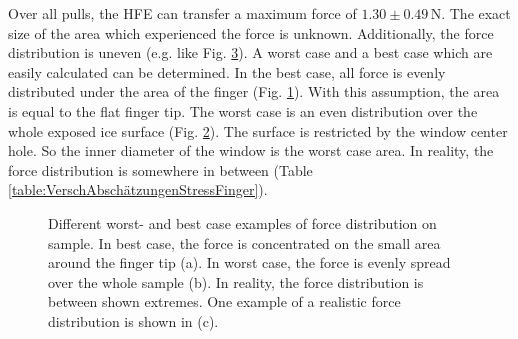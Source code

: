 Over all pulls, the HFE can transfer a maximum force of $1.30\pm0.49\,\si{\newton}$. The exact size of the area which experienced the force is unknown. Additionally, the force distribution is uneven (e.g. like Fig. \ref{fig:ZeichnungBerechnungStress_c}). A worst case and a best case which are easily calculated can be determined. In the best case, all force is evenly distributed under the area of the finger (Fig. \ref{fig:ZeichnungBerechnungStress_a}). With this assumption, the area is equal to the flat finger tip. The worst case is an even distribution over the whole exposed ice surface (Fig. \ref{fig:ZeichnungBerechnungStress_b}). The surface is restricted by the window center hole. So the inner diameter of the window is the worst case area. In reality, the force distribution is somewhere in between (Table \ref{table:VerschAbschätzungenStressFinger}).

\begin{figure}[hbt!]
	\centering
	\begin{subfigure}[]{0.3\textwidth}
		\centering
		
		\caption{}
		\label{fig:ZeichnungBerechnungStress_a}
	\end{subfigure}
	\begin{subfigure}[]{0.3\textwidth}
		\centering
		
		\caption{}
		\label{fig:ZeichnungBerechnungStress_b}
	\end{subfigure}
	\begin{subfigure}[]{0.3\textwidth}
		\centering
		
		\caption{}
		\label{fig:ZeichnungBerechnungStress_c}
	\end{subfigure}
	\caption{Different worst- and best case examples of force distribution on sample. In best case, the force is concentrated on the small area around the finger tip (a). In worst case, the force is evenly spread over the whole sample (b). In reality, the force distribution is between shown extremes. One example of a realistic force distribution is shown in (c).}
	\label{fig:ZeichnungBerechnungStress}
\end{figure}



